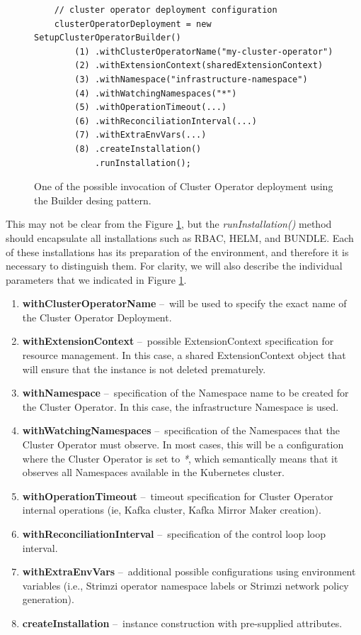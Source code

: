 \begin{figure}[ht!]
    \centering
    \begin{verbatim}
    // cluster operator deployment configuration
    clusterOperatorDeployment = new SetupClusterOperatorBuilder()
        (1) .withClusterOperatorName("my-cluster-operator")
        (2) .withExtensionContext(sharedExtensionContext)
        (3) .withNamespace("infrastructure-namespace")
        (4) .withWatchingNamespaces("*")
        (5) .withOperationTimeout(...)
        (6) .withReconciliationInterval(...)
        (7) .withExtraEnvVars(...)
        (8) .createInstallation()
            .runInstallation();
    \end{verbatim}
    \caption{One of the possible invocation of Cluster Operator deployment using the Builder desing pattern.}
    \label{05:fig:clusteroperatorinstallation}
\end{figure}

This may not be clear from the Figure \ref{05:fig:clusteroperatorinstallation}, but the \emph{runInstallation()} method should encapsulate all installations such as RBAC, HELM, and BUNDLE. Each of these installations has its preparation of the environment, and therefore it is necessary to distinguish them. For clarity, we will also describe the individual parameters that we indicated in Figure \ref{05:fig:clusteroperatorinstallation}.

\begin{enumerate}[itemsep = 1mm, parsep = 0pt]
    \item \textbf{withClusterOperatorName} \---\ will be used to specify the exact name of the Cluster Operator Deployment.
    \item \textbf{withExtensionContext} \---\ possible ExtensionContext specification for resource management.
    In this case, a shared ExtensionContext object that will ensure that the instance is not deleted prematurely.
    \item \textbf{withNamespace} \---\ specification of the Namespace name to be created for the Cluster Operator.
    In this case, the infrastructure Namespace is used.
    \item \textbf{withWatchingNamespaces} \---\ specification of the Namespaces that the Cluster Operator must observe.
    In most cases, this will be a configuration where the Cluster Operator is set to \emph{*}, which semantically means that it observes all Namespaces available in the Kubernetes cluster.
    \item \textbf{withOperationTimeout} \---\ timeout specification for Cluster Operator internal operations (ie, Kafka cluster, Kafka Mirror Maker creation).
    \item \textbf{withReconciliationInterval} \---\ specification of the control loop loop interval.
    \item \textbf{withExtraEnvVars} \---\ additional possible configurations using environment variables (i.e., Strimzi operator namespace labels or Strimzi network policy generation).
    \item \textbf{createInstallation} \---\ instance construction with pre-supplied attributes.
\end{enumerate}

